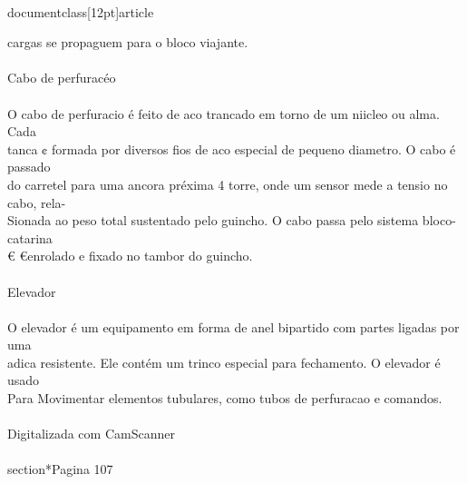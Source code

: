 \\documentclass[12pt]{article}
\begin{document}
cargas se propaguem para o bloco viajante.\\
\\
Cabo de perfuracéo\\
\\
O cabo de perfuracio é feito de aco trancado em torno de um niicleo ou alma. Cada\\
tanca ¢ formada por diversos fios de aco especial de pequeno diametro. O cabo é passado\\
do carretel para uma ancora préxima 4 torre, onde um sensor mede a tensio no cabo, rela-\\
Sionada ao peso total sustentado pelo guincho. O cabo passa pelo sistema bloco-catarina\\
€ €enrolado e fixado no tambor do guincho.\\
\\
Elevador\\
\\
O elevador é um equipamento em forma de anel bipartido com partes ligadas por uma\\
adica resistente. Ele contém um trinco especial para fechamento. O elevador é usado\\
Para Movimentar elementos tubulares, como tubos de perfuracao e comandos.\\
\\
Digitalizada com CamScanner\\

\\section*{Pagina 107}
\end{document}
